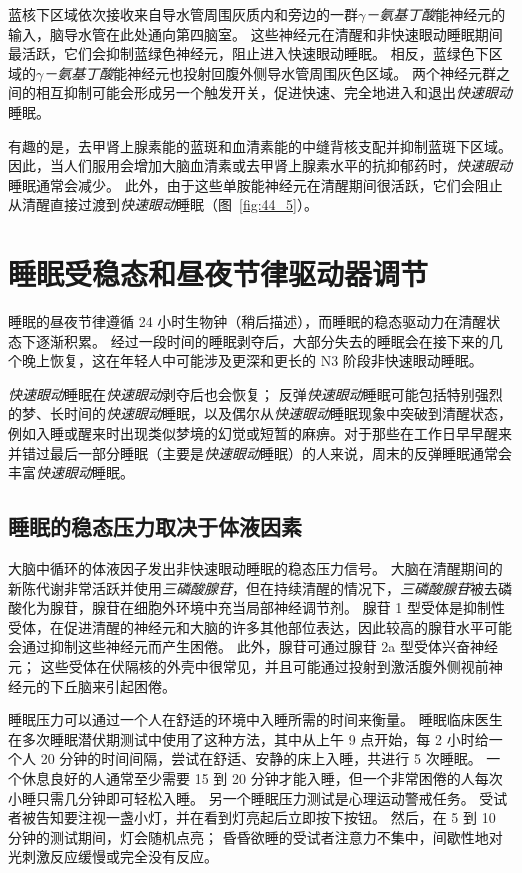 蓝核下区域依次接收来自导水管周围灰质内和旁边的一群\textit{$\gamma$－氨基丁酸}能神经元的输入，脑导水管在此处通向第四脑室。
这些神经元在清醒和非快速眼动睡眠期间最活跃，它们会抑制蓝绿色神经元，阻止进入快速眼动睡眠。
相反，蓝绿色下区域的\textit{$\gamma$－氨基丁酸}能神经元也投射回腹外侧导水管周围灰色区域。
两个神经元群之间的相互抑制可能会形成另一个触发开关，促进快速、完全地进入和退出\textit{快速眼动}睡眠。


有趣的是，去甲肾上腺素能的蓝斑和血清素能的中缝背核支配并抑制蓝斑下区域。
因此，当人们服用会增加大脑血清素或去甲肾上腺素水平的抗抑郁药时，\textit{快速眼动}睡眠通常会减少。
此外，由于这些单胺能神经元在清醒期间很活跃，它们会阻止从清醒直接过渡到\textit{快速眼动}睡眠（图~\ref{fig:44_5}）。



\section{睡眠受稳态和昼夜节律驱动器调节}

睡眠的昼夜节律遵循 24 小时生物钟（稍后描述），而睡眠的稳态驱动力在清醒状态下逐渐积累。
经过一段时间的睡眠剥夺后，大部分失去的睡眠会在接下来的几个晚上恢复，这在年轻人中可能涉及更深和更长的 N3 阶段非快速眼动睡眠。


\textit{快速眼动}睡眠在\textit{快速眼动}剥夺后也会恢复；
反弹\textit{快速眼动}睡眠可能包括特别强烈的梦、长时间的\textit{快速眼动}睡眠，以及偶尔从\textit{快速眼动}睡眠现象中突破到清醒状态，例如入睡或醒来时出现类似梦境的幻觉或短暂的麻痹。对于那些在工作日早早醒来并错过最后一部分睡眠（主要是\textit{快速眼动}睡眠）的人来说，周末的反弹睡眠通常会丰富\textit{快速眼动}睡眠。



\subsection{睡眠的稳态压力取决于体液因素}

大脑中循环的体液因子发出非快速眼动睡眠的稳态压力信号。
大脑在清醒期间的新陈代谢非常活跃并使用\textit{三磷酸腺苷}，但在持续清醒的情况下，\textit{三磷酸腺苷}被去磷酸化为腺苷，腺苷在细胞外环境中充当局部神经调节剂。
腺苷 1 型受体是抑制性受体，在促进清醒的神经元和大脑的许多其他部位表达，因此较高的腺苷水平可能会通过抑制这些神经元而产生困倦。
此外，腺苷可通过腺苷 2a 型受体兴奋神经元；
这些受体在伏隔核的外壳中很常见，并且可能通过投射到激活腹外侧视前神经元的下丘脑来引起困倦。


睡眠压力可以通过一个人在舒适的环境中入睡所需的时间来衡量。
睡眠临床医生在多次睡眠潜伏期测试中使用了这种方法，其中从上午 9 点开始，每 2 小时给一个人 20 分钟的时间间隔，尝试在舒适、安静的床上入睡，共进行 5 次睡眠。
一个休息良好的人通常至少需要 15 到 20 分钟才能入睡，但一个非常困倦的人每次小睡只需几分钟即可轻松入睡。
另一个睡眠压力测试是心理运动警戒任务。
受试者被告知要注视一盏小灯，并在看到灯亮起后立即按下按钮。
然后，在 5 到 10 分钟的测试期间，灯会随机点亮；
昏昏欲睡的受试者注意力不集中，间歇性地对光刺激反应缓慢或完全没有反应。



